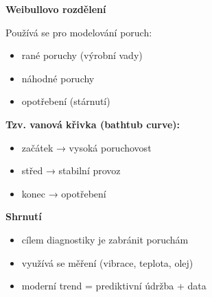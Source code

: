 \documentclass[a4paper,10pt]{article}
\begin{document}
\begin{vysvetlenibox}
\textbf{Weibullovo rozdělení}

Používá se pro modelování poruch:

\begin{itemize}
\item rané poruchy (výrobní vady)
\item náhodné poruchy
\item opotřebení (stárnutí)
\end{itemize}

\textbf{Tzv. vanová křivka (bathtub curve):}
\begin{itemize}
\item začátek → vysoká poruchovost
\item střed → stabilní provoz
\item konec → opotřebení
\end{itemize}

\textbf{Shrnutí}

\begin{itemize}
\item cílem diagnostiky je zabránit poruchám
\item využívá se měření (vibrace, teplota, olej)
\item moderní trend = prediktivní údržba + data
\end{itemize}

\end{vysvetlenibox}
\end{document}
